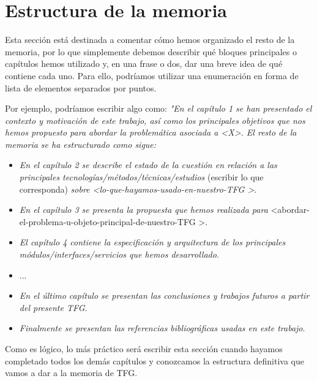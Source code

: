 \section{Estructura de la memoria}
Esta sección está destinada a comentar cómo hemos organizado el resto de la memoria, por lo que simplemente debemos describir qué bloques principales o capítulos hemos utilizado y, en una frase o dos, dar una breve idea de qué contiene cada uno. Para ello, podríamos utilizar una enumeración en forma de lista de elementos separados por puntos.

Por ejemplo, podríamos escribir algo como: \textit{"En el capítulo 1 se han presentado el contexto y motivación de este trabajo, así como los principales objetivos que nos hemos propuesto para abordar la problemática asociada a \textless X\textgreater. El resto de la memoria se ha estructurado como sigue:}

\begin{itemize}
  \item \textit{En el capítulo 2 se describe el estado de la cuestión en relación a las principales tecnologías/métodos/técnicas/estudios} (escribir lo que corresponda)\textit{ sobre \textless lo-que-hayamos-usado-en-nuestro-TFG \textgreater}.
  \item \textit{En el capítulo 3 se presenta la propuesta que hemos realizada para} \textless abordar-el-problema-u-objeto-principal-de-nuestro-TFG \textgreater.
  \item \textit{El capítulo 4 contiene la especificación y arquitectura de los principales módulos/interfaces/servicios que hemos desarrollado}.
  \item ...
  \item \textit{En el último capítulo se presentan las conclusiones y trabajos futuros a partir del presente TFG}.
  \item \textit{Finalmente se presentan las referencias bibliográficas usadas en este trabajo}.
\end{itemize}

Como es lógico, lo más práctico será escribir esta sección cuando hayamos completado todos los demás capítulos y conozcamos la estructura definitiva que vamos a dar a la memoria de TFG.
